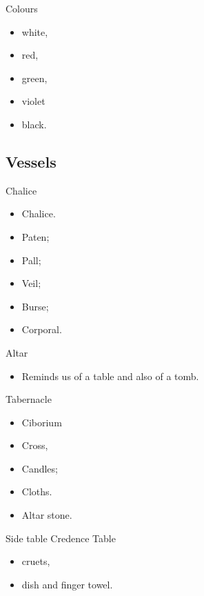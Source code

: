 \documentclass{beamer}
\begin{document}
\begin{frame}{Colours}
\begin{itemize}
\item white,
\item red,
\item green, 
\item violet
\item black.
\end{itemize}
\end{frame}

\subsection{Vessels}


\begin{frame}{Chalice}
\begin{itemize}
\item Chalice.
\item Paten;
\item Pall;
\item Veil;
\item Burse;
\item Corporal.
\end{itemize}
\end{frame}

\begin{frame}{Altar}
\begin{itemize}
\item Reminds us of a table and also of a tomb.
\end{itemize}
\end{frame}

\begin{frame}{Tabernacle}
\begin{itemize}
\item Ciborium
\item Cross,
\item Candles;
\item Cloths.
\item Altar stone.
\end{itemize}
\end{frame}

\begin{frame}{Side table}
Credence Table
\begin{itemize}
\item cruets,
\item dish and finger towel.
\end{itemize}
\end{frame}
\end{document}
